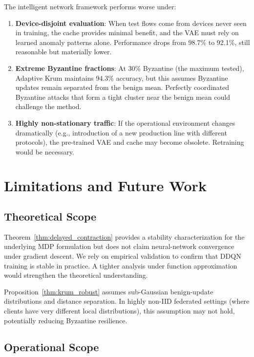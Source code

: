 \documentclass[preprint,12pt]{elsarticle}
\begin{document}
The intelligent network framework performs worse under:

\begin{enumerate}[label=(\roman*),leftmargin=1.2em]
    \item \textbf{Device-disjoint evaluation}: When test flows come from devices never seen in training, the cache provides minimal benefit, and the VAE must rely on learned anomaly patterns alone. Performance drops from 98.7\% to 92.1\%, still reasonable but materially lower.
    
    \item \textbf{Extreme Byzantine fractions}: At 30\% Byzantine (the maximum tested), Adaptive Krum maintains 94.3\% accuracy, but this assumes Byzantine updates remain separated from the benign mean. Perfectly coordinated Byzantine attacks that form a tight cluster near the benign mean could challenge the method.
    
    \item \textbf{Highly non-stationary traffic}: If the operational environment changes dramatically (e.g., introduction of a new production line with different protocols), the pre-trained VAE and cache may become obsolete. Retraining would be necessary.
\end{enumerate}

\section{Limitations and Future Work}
\label{sec:limitations}

\subsection{Theoretical Scope}

Theorem~\ref{thm:delayed_contraction} provides a stability characterization for the underlying MDP formulation but does not claim neural-network convergence under gradient descent. We rely on empirical validation to confirm that DDQN training is stable in practice. A tighter analysis under function approximation would strengthen the theoretical understanding.

Proposition~\ref{thm:krum_robust} assumes sub-Gaussian benign-update distributions and distance separation. In highly non-IID federated settings (where clients have very different local distributions), this assumption may not hold, potentially reducing Byzantine resilience.

\subsection{Operational Scope}
\end{document}
